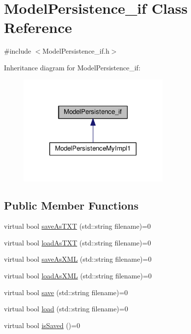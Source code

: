 \hypertarget{class_model_persistence__if}{\section{Model\-Persistence\-\_\-if Class Reference}
\label{class_model_persistence__if}
}


{\ttfamily \#include $<$Model\-Persistence\-\_\-if.\-h$>$}



Inheritance diagram for Model\-Persistence\-\_\-if\-:\nopagebreak
\begin{figure}[H]
\begin{center}
\leavevmode
\includegraphics[width=212pt]{class_model_persistence__if__inherit__graph}
\end{center}
\end{figure}
\subsection*{Public Member Functions}
\begin{DoxyCompactItemize}
\item 
virtual bool \hyperlink{class_model_persistence__if_a4cabe06b4f610b9237c52208ee6c51bd}{save\-As\-T\-X\-T} (std\-::string filename)=0
\item 
virtual bool \hyperlink{class_model_persistence__if_af1ee016d7810fc3798b5bf013398de7f}{load\-As\-T\-X\-T} (std\-::string filename)=0
\item 
virtual bool \hyperlink{class_model_persistence__if_afb8e1011e873757febfb0d055d592d38}{save\-As\-X\-M\-L} (std\-::string filename)=0
\item 
virtual bool \hyperlink{class_model_persistence__if_a8c44f9b2e917b33812cbaa7c844854c8}{load\-As\-X\-M\-L} (std\-::string filename)=0
\item 
virtual bool \hyperlink{class_model_persistence__if_a960acf977c56ed52a153524c6ed8d4c6}{save} (std\-::string filename)=0
\item 
virtual bool \hyperlink{class_model_persistence__if_a48f90bbb37e106ee4b423075660d5a73}{load} (std\-::string filename)=0
\item 
virtual bool \hyperlink{class_model_persistence__if_aac4b87300487d7b5a126979671c05d16}{is\-Saved} ()=0
\end{DoxyCompactItemize}


